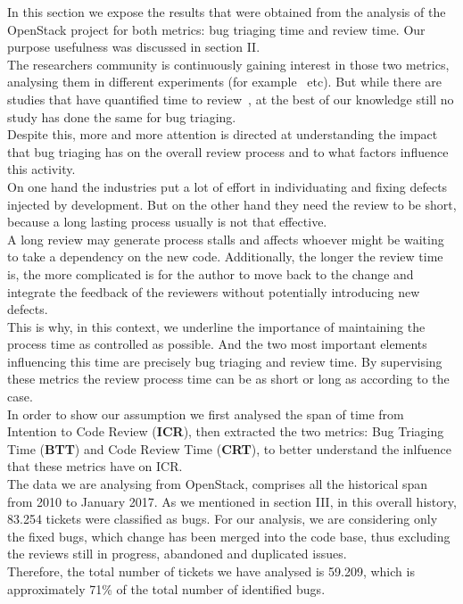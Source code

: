\documentclass[10pt, conference]{IEEEtran}
\begin{document}
In this section we expose the results that were obtained from the analysis 
of the OpenStack project for both metrics: bug triaging time and review time. 
Our purpose usefulness was discussed in section II.
\\
The researchers community is continuously gaining interest in those two metrics, 
analysing them in different experiments (for example~\cite{bib13,bib14,bib16,bib18,bib19} etc). 
But while there are studies that have quantified time to review~\cite{bib13,bib14}, at the best 
of our knowledge still no study has done the same for bug triaging.
\\
Despite this, more and more attention is directed at understanding the impact that bug triaging 
has on the overall review process and to what factors influence this activity.
\\ %
On one hand the industries put a lot of effort in individuating and fixing 
defects injected by development. But on the other hand they need the review to be short, 
because a long lasting process usually is not that effective. 
\\
A long review may generate process stalls and affects whoever might be waiting to take 
a dependency on the new code.
Additionally, the longer the review time is, the more complicated is for the author to move back to 
the change and integrate the feedback of the reviewers without potentially introducing new defects. 
\\
This is why, in this context, we underline the importance of maintaining the process time as 
controlled as possible. And the two most important elements influencing this time are precisely 
bug triaging and review time. By supervising these metrics the review process time can be as 
short or long as according to the case. 
\\ %
In order to show our assumption we first analysed the span of time from Intention to Code Review (\textbf{ICR}), 
then extracted the two metrics: Bug Triaging Time (\textbf{BTT}) and Code Review Time (\textbf{CRT}), to better 
understand the inlfuence that these metrics have on ICR.
\\
The data we are analysing from OpenStack, comprises all the historical span from 2010 to January 2017. 
As we mentioned in section III, in this overall history, 83.254 tickets were classified as bugs. 
For our analysis, we are considering 
only the fixed bugs, which change has been merged into the code base, thus excluding the reviews still in 
progress, abandoned and duplicated issues. 
\\Therefore, the total number of tickets we have analysed is 59.209, which is approximately 71\% of the total 
number of identified bugs. 
\end{document}
